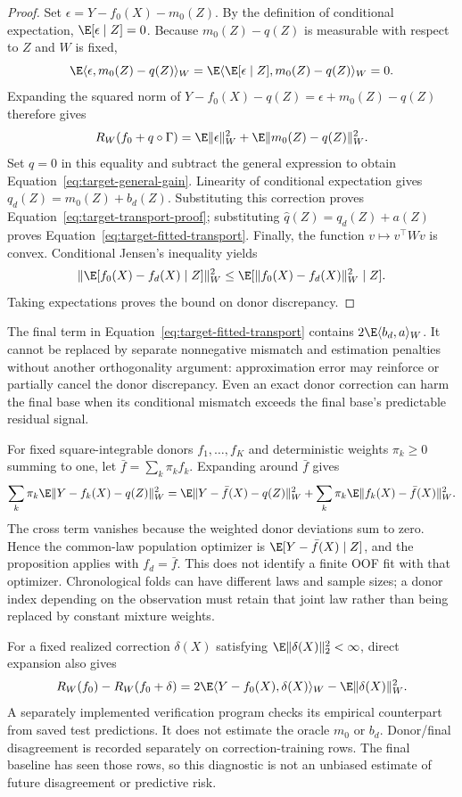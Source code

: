 \begin{proof}
Set $\epsilon=Y-f_0(X)-m_0(Z)$. By the definition of conditional
expectation, $\E[\epsilon\mid Z]=0$. Because $m_0(Z)-q(Z)$ is
measurable with respect to $Z$ and $W$ is fixed,
\[
 \E\langle\epsilon,m_0(Z)-q(Z)\rangle_W
 =\E\langle\E[\epsilon\mid Z],m_0(Z)-q(Z)\rangle_W=0.
\]
Expanding the squared norm of
$Y-f_0(X)-q(Z)=\epsilon+m_0(Z)-q(Z)$ therefore gives
\[
 R_W(f_0+q\circ\Gamma)
 =\E\|\epsilon\|_W^2+\E\|m_0(Z)-q(Z)\|_W^2.
\]
Set $q=0$ in this equality and subtract the general expression to
obtain Equation~\eqref{eq:target-general-gain}. Linearity of conditional
expectation gives
$q_d(Z)=m_0(Z)+b_d(Z)$. Substituting this correction proves
Equation~\eqref{eq:target-transport-proof}; substituting
$\widehat q(Z)=q_d(Z)+a(Z)$ proves
Equation~\eqref{eq:target-fitted-transport}.
Finally, the function $v\mapsto v^\top Wv$ is convex. Conditional
Jensen's inequality yields
\[
 \|\E[f_0(X)-f_d(X)\mid Z]\|_W^2
 \leq\E[\|f_0(X)-f_d(X)\|_W^2\mid Z].
\]
Taking expectations proves the bound on donor discrepancy.
\end{proof}

The final term in Equation~\eqref{eq:target-fitted-transport} contains
$2\E\langle b_d,a\rangle_W$. It cannot be replaced by separate
nonnegative mismatch and estimation penalties without another
orthogonality argument: approximation error may reinforce or partially
cancel the donor discrepancy. Even an exact donor correction can harm
the final base when its conditional mismatch exceeds the final base's
predictable residual signal.

For fixed square-integrable donors $f_1,\ldots,f_K$ and deterministic weights
$\pi_k\geq0$ summing to one, let $\bar f=\sum_k\pi_k f_k$.
Expanding around $\bar f$ gives
\[
 \sum_k\pi_k\E\|Y-f_k(X)-q(Z)\|_W^2
 =\E\|Y-\bar f(X)-q(Z)\|_W^2
  +\sum_k\pi_k\E\|f_k(X)-\bar f(X)\|_W^2.
\]
The cross term vanishes because the weighted donor deviations sum to
zero. Hence the common-law population optimizer is
$\E[Y-\bar f(X)\mid Z]$, and the proposition applies with
$f_d=\bar f$. This does not identify a finite OOF fit with that
optimizer. Chronological folds can have different laws and sample
sizes; a donor index depending on the observation must retain that
joint law rather than being replaced by constant mixture weights.

For a fixed realized correction $\delta(X)$ satisfying
$\E\|\delta(X)\|_2^2<\infty$, direct expansion also gives
\begin{equation}
 R_W(f_0)-R_W(f_0+\delta)
 =2\E\langle Y-f_0(X),\delta(X)\rangle_W
  -\E\|\delta(X)\|_W^2.
 \label{eq:target-alignment-audit}
\end{equation}
A separately implemented verification program checks its empirical
counterpart from saved test predictions. It does not estimate the oracle $m_0$ or $b_d$.
Donor/final disagreement is recorded separately on correction-training
rows. The final baseline has seen those rows, so this diagnostic is not
an unbiased estimate of future disagreement or predictive risk.

